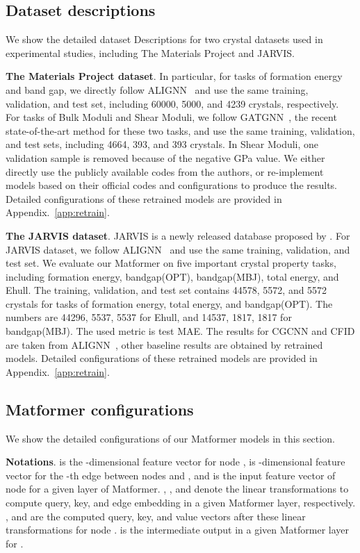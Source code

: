 \documentclass{article}
\begin{document}
\subsection{Dataset descriptions}
\label{app:dataset_des}
We show the detailed dataset Descriptions for two crystal datasets used in experimental studies, including The Materials Project and JARVIS.

\textbf{The Materials Project dataset}. In particular,
for tasks of formation energy and band gap, we directly follow ALIGNN~\citep{alignn} and use the same training, validation, and test set, including 60000, 5000, and 4239 crystals, respectively. For tasks of Bulk Moduli and Shear Moduli, we follow GATGNN~\citep{gatgnn}, the recent state-of-the-art method for these two tasks, and use the same training, validation, and test sets, including 4664, 393, and 393 crystals. In Shear Moduli, one validation sample is removed because of the negative GPa value. 
We either directly use the publicly available codes from the authors, or re-implement models based on their official codes and configurations to produce the results. Detailed configurations of these retrained models are provided in Appendix.~\ref{app:retrain}. 

\textbf{The JARVIS dataset}. JARVIS is a newly released database proposed by \citet{choudhary2020joint}. For JARVIS dataset, we follow ALIGNN~\citep{alignn} and use the same training, validation, and test set. We evaluate our Matformer on five important crystal property tasks, including formation energy, bandgap(OPT), bandgap(MBJ), total energy, and Ehull. The training, validation, and test set contains 44578, 5572, and 5572 crystals for tasks of formation energy, total energy, and bandgap(OPT). The numbers are 44296, 5537, 5537 for Ehull, and 14537, 1817, 1817 for bandgap(MBJ). The used metric is test MAE. The results for CGCNN and CFID are taken from ALIGNN~\citep{alignn}, other baseline results are obtained by retrained models. Detailed configurations of these retrained models are provided in Appendix.~\ref{app:retrain}. 

\subsection{Matformer configurations}
\label{app:matconfig}
We show the detailed configurations of our Matformer models in this section.

\textbf{Notations}.  is the -dimensional feature vector for node ,  is -dimensional feature vector for the -th edge between nodes  and , and  is the input feature vector of node  for a given layer of Matformer. , , and  denote the linear transformations to compute query, key, and edge embedding in a given Matformer layer, respectively. ,  and  are the computed query, key, and value vectors after these linear transformations for node .
 is the intermediate output in a given Matformer layer for . 
\end{document}
